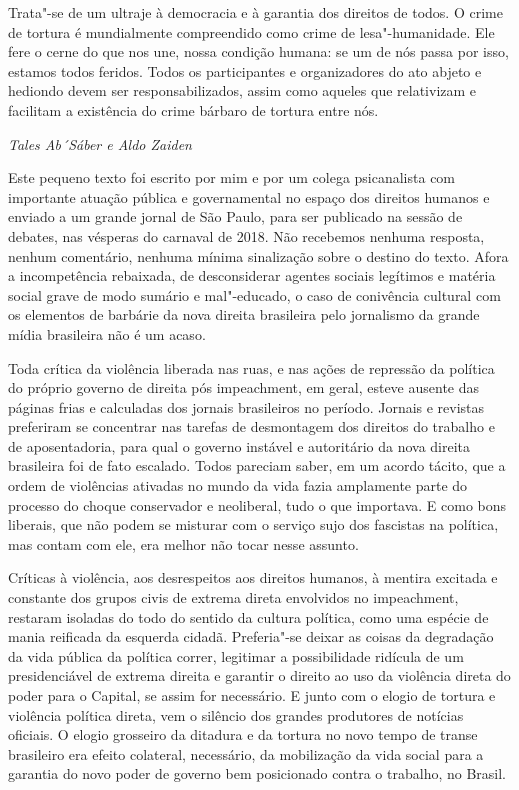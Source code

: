 Trata"-se de um ultraje à democracia e à garantia dos direitos de todos.
O crime de tortura é mundialmente compreendido como crime de
lesa"-humanidade. Ele fere o cerne do que nos une, nossa condição humana:
se um de nós passa por isso, estamos todos feridos. Todos os
participantes e organizadores do ato abjeto e hediondo devem ser
responsabilizados, assim como aqueles que relativizam e facilitam a
existência do crime bárbaro de tortura entre nós.

\begin{flushright}
\emph{Tales Ab´Sáber e Aldo Zaiden}
\end{flushright}

\begin{center}
\end{center}

Este pequeno texto foi escrito por mim e por um colega psicanalista com
importante atuação pública e governamental no espaço dos direitos
humanos e enviado a um grande jornal de São Paulo, para ser publicado na
sessão de debates, nas vésperas do carnaval de 2018. Não recebemos
nenhuma resposta, nenhum comentário, nenhuma mínima sinalização sobre o
destino do texto. Afora a incompetência rebaixada, de desconsiderar
agentes sociais legítimos e matéria social grave de modo sumário e
mal"-educado, o caso de conivência cultural com os elementos de barbárie
da nova direita brasileira pelo jornalismo da grande mídia brasileira
não é um acaso.

Toda crítica da violência liberada nas ruas, e nas ações de repressão da
política do próprio governo de direita pós impeachment, em geral, esteve
ausente das páginas frias e calculadas dos jornais brasileiros no
período. Jornais e revistas preferiram se concentrar nas tarefas de
desmontagem dos direitos do trabalho e de aposentadoria, para qual o
governo instável e autoritário da nova direita brasileira foi de fato
escalado. Todos pareciam saber, em um acordo tácito, que a ordem de
violências ativadas no mundo da vida fazia amplamente parte do processo
do choque conservador e neoliberal, tudo o que importava. E como bons
liberais, que não podem se misturar com o serviço sujo dos fascistas na
política, mas contam com ele, era melhor não tocar nesse assunto.

Críticas à violência, aos desrespeitos aos direitos humanos, à mentira
excitada e constante dos grupos civis de extrema direta envolvidos no
impeachment, restaram isoladas do todo do sentido da cultura política,
como uma espécie de mania reificada da esquerda cidadã. Preferia"-se deixar as
coisas da degradação da vida pública da política correr, legitimar a
possibilidade ridícula de um presidenciável de extrema direita e garantir
o direito ao uso da violência direta do poder para o Capital, se assim
for necessário. E junto com o elogio de tortura e violência política
direta, vem o silêncio dos grandes produtores de notícias oficiais. O
elogio grosseiro da ditadura e da tortura no novo tempo de transe
brasileiro era efeito colateral, necessário, da mobilização da vida
social para a garantia do novo poder de governo bem posicionado
contra o trabalho, no Brasil.

